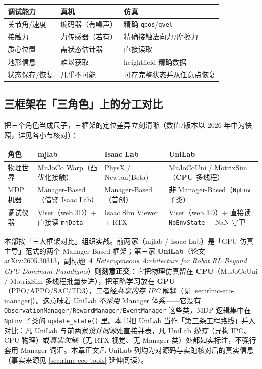 \begin{center}
\small
\begin{tabular}{@{}lll@{}}
\toprule
调试能力 & 真机 & 仿真 \\
\midrule
关节角/速度 & 编码器（有噪声） & 精确 \verb|qpos|/\verb|qvel| \\
接触力 & 力传感器（若有） & 精确接触法向力/摩擦力 \\
质心位置 & 需状态估计器 & 直接读取 \\
地形信息 & 难以获取 & heightfield 精确数据 \\
状态保存/恢复 & 几乎不可能 & 可存完整状态并从任意点恢复 \\
\bottomrule
\end{tabular}
\end{center}

\subsection{三框架在「三角色」上的分工对比}

把三个角色当成尺子，三框架的定位差异立刻清晰（数值/版本以 2026 年中为快照，详见各小节核对）：

\begin{center}
\small
\begin{tabular}{@{}llll@{}}
\toprule
角色 & mjlab & Isaac Lab & UniLab \\
\midrule
物理世界 & MuJoCo Warp（凸优化接触） & PhysX / Newton(Beta) & MuJoCoUni / MotrixSim（\textbf{CPU} 多线程） \\
MDP 机器 & Manager-Based（借鉴 Isaac Lab） & Manager-Based（首创） & \textbf{非} Manager-Based（\verb|NpEnv| 子类） \\
调试仪器 & Viser（web 3D）+ 直接读 \verb|mjData| & Isaac Sim Viewer + RTX & Viser（web 3D）+ 直接读 \verb|NpEnvState| + NaN 守卫 \\
\bottomrule
\end{tabular}
\end{center}

\begin{note}
本部按「三大框架对比」组织实战。前两家（mjlab / Isaac Lab）是「GPU 仿真主导」范式的两个 Manager-Based 框架；第三家 \textbf{UniLab}（论文 arXiv:2605.30313，副标题 \emph{A Heterogeneous Architecture for Robot RL Beyond GPU-Dominant Paradigms}）则\textbf{刻意正交}：它把物理仿真留在 \textbf{CPU}（MuJoCoUni / MotrixSim 多线程批量步进），把策略学习放在 \textbf{GPU}（PPO/APPO/SAC/TD3），二者经\emph{共享内存 IPC} 解耦（见 \cref{sec:rlmc-eco-manager}）。这意味着 UniLab \emph{不采用} Manager 体系——它没有 \verb|ObservationManager|/\verb|RewardManager|/\verb|EventManager| 这些类，MDP 逻辑集中在 \verb|NpEnv| 子类的 \verb|update_state()| 里。本书把 UniLab 当作「第三条工程路线」并入对比：凡 UniLab 与前两家\emph{设计同源}处直接并表，凡 UniLab \emph{独有}（异构 IPC、CPU 物理）或\emph{真实欠缺}（无 RTX 视觉、无 Manager 类）处都如实标注，不强行套用 Manager 词汇。本章正文凡 UniLab 列均为对源码与实跑核对后的真实信息（事实来源见 \cref{sec:rlmc-eco-tools} 延伸阅读）。
\end{note}


